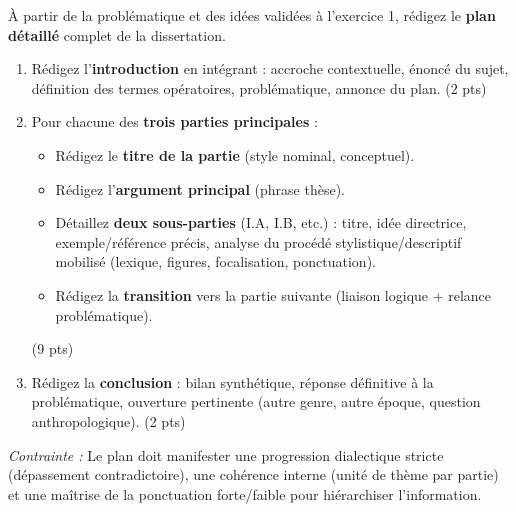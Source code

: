 \documentclass[11pt]{article}
\begin{document}
\begin{exercice}
À partir de la problématique et des idées validées à l'exercice 1, rédigez le \textbf{plan détaillé} complet de la dissertation. 

\begin{enumerate}
    \item Rédigez l'\textbf{introduction} en intégrant : accroche contextuelle, énoncé du sujet, définition des termes opératoires, problématique, annonce du plan. (2 pts)
    \item Pour chacune des \textbf{trois parties principales} :
    \begin{itemize}
        \item Rédigez le \textbf{titre de la partie} (style nominal, conceptuel).
        \item Rédigez l'\textbf{argument principal} (phrase thèse).
        \item Détaillez \textbf{deux sous-parties} (I.A, I.B, etc.) : titre, idée directrice, exemple/référence précis, analyse du procédé stylistique/descriptif mobilisé (lexique, figures, focalisation, ponctuation).
        \item Rédigez la \textbf{transition} vers la partie suivante (liaison logique + relance problématique).
    \end{itemize}
    (9 pts)
    \item Rédigez la \textbf{conclusion} : bilan synthétique, réponse définitive à la problématique, ouverture pertinente (autre genre, autre époque, question anthropologique). (2 pts)
\end{enumerate}
\textit{Contrainte :} Le plan doit manifester une progression dialectique stricte (dépassement contradictoire), une cohérence interne (unité de thème par partie) et une maîtrise de la ponctuation forte/faible pour hiérarchiser l'information.
\end{exercice}
\end{document}
